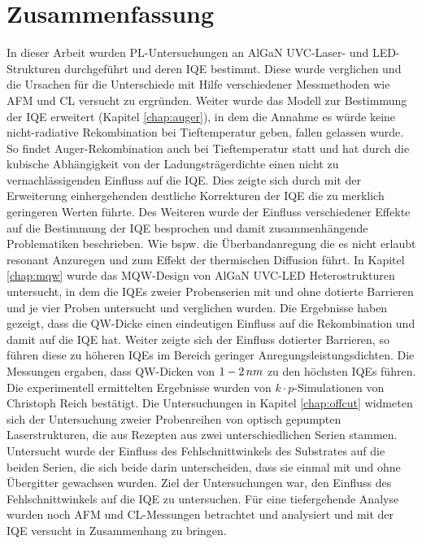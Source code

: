 
\chapter{Zusammenfassung}

\thispagestyle{fancy}


In dieser Arbeit wurden PL-Untersuchungen an AlGaN UVC-Laser- und LED-Strukturen durchgeführt und deren IQE bestimmt. Diese wurde verglichen und die Ursachen für die Unterschiede mit Hilfe verschiedener Messmethoden wie AFM und CL versucht zu ergründen. Weiter wurde das Modell zur Bestimmung der IQE erweitert (Kapitel \ref{chap:auger}), in dem die Annahme es würde keine nicht-radiative Rekombination bei Tieftemperatur geben, fallen gelassen wurde. So findet Auger-Rekombination auch bei Tieftemperatur statt und hat durch die kubische Abhängigkeit von der Ladungsträgerdichte einen nicht zu vernachlässigenden Einfluss auf die IQE. Dies zeigte sich durch mit der Erweiterung einhergehenden deutliche Korrekturen der IQE die zu merklich geringeren Werten führte. Des Weiteren wurde der Einfluss verschiedener Effekte auf die Bestimmung der IQE besprochen und damit zusammenhängende Problematiken beschrieben. Wie bspw. die Überbandanregung die es nicht erlaubt resonant Anzuregen und zum Effekt der thermischen Diffusion führt. 
\newline
In Kapitel \ref{chap:mqw} wurde das MQW-Design von AlGaN UVC-LED Heterostrukturen untersucht, in dem die IQEs zweier Probenserien mit und ohne
dotierte Barrieren und je vier Proben untersucht und verglichen wurden.  
Die Ergebnisse haben gezeigt, dass die QW-Dicke einen eindeutigen Einfluss auf die Rekombination und damit auf die IQE hat. Weiter zeigte sich der Einfluss dotierter Barrieren, so führen diese zu höheren IQEs im Bereich geringer Anregungsleistungsdichten. Die Messungen ergaben, dass QW-Dicken von $1-2 \thinspace nm$ zu den höchsten IQEs führen. Die experimentell ermittelten Ergebnisse wurden von $k \cdot p$-Simulationen von Christoph Reich bestätigt. 
\newline
Die Untersuchungen in Kapitel \ref{chap:offcut} widmeten sich der Untersuchung zweier Probenreihen von optisch gepumpten Laserstrukturen, die aus Rezepten aus zwei unterschiedlichen Serien stammen. Untersucht wurde der Einfluss des Fehlschnittwinkels des Substrates auf die beiden Serien, die sich beide darin unterscheiden, dass sie einmal mit und ohne Übergitter gewachsen wurden. Ziel der Untersuchungen war, den Einfluss des Fehlschnittwinkels auf die IQE zu untersuchen. Für eine tiefergehende Analyse wurden noch AFM und CL-Messungen betrachtet und analysiert und mit der IQE versucht in Zusammenhang zu bringen. 

